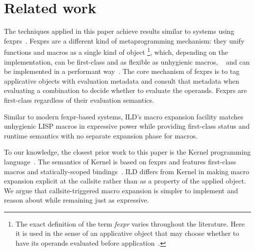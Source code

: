 \section{Related work}
\label{fexpr-comparison}

The techniques applied in this paper achieve results similar to systems using
fexprs~\cite{fexpr-shutt,kernel-report,fexpr-pe}.
Fexprs are a different kind of metaprogramming mechanism: they unify functions
and macros as a single kind of object%
\footnote{
    The exact definition of the term \emph{fexpr} varies throughout
    the literature. Here it is used in the sense of an applicative object
    that may choose whether to have its operands evaluated before
    application~\cite{fexpr-shutt}.
}, which, depending on the implementation,
can be first-class and as flexible as unhygienic macros,%
~\cite{kohlbecker1986syntactic,fexpr-shutt} and can be implemented
in a performant way~\cite{fexpr-pe}. The core mechanism of fexprs is
to tag applicative objects with evaluation metadata and consult that metadata
when evaluating a combination to decide whether to evaluate the operands.
Fexprs are first-class regardless of their evaluation semantics.%
~\cite{fexpr-shutt,kernel-report}

Similar to modern fexpr-based systems, ILD's macro expansion facility matches
unhygienic LISP macros in expressive power while providing first-class
status and runtime semantics with no separate expansion phase for macros.

To our knowledge, the closest prior work to this paper is the Kernel
programming language~\cite{kernel-report}. The semantics of Kernel is based on
fexprs and features first-class macros and statically-scoped
bindings~\cite{kernel-report,fexpr-shutt}. ILD differs from Kernel in
making macro expansion explicit at the callsite rather than
as a property of the applied object.
We argue that callsite-triggered macro expansion is simpler to implement and
reason about while remaining just as expressive.
